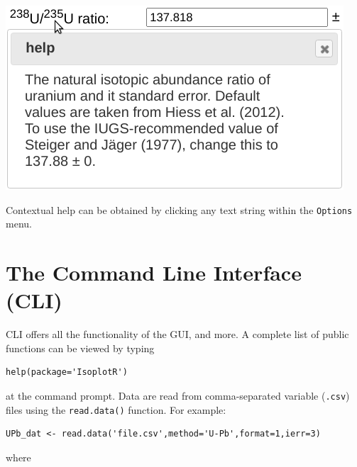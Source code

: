 \begin{refsection}
\noindent\begin{minipage}[t]{.45\textwidth}
\strut\vspace*{-\baselineskip}\newline
\includegraphics[width=\textwidth]{../figures/contextualhelp.png}
\end{minipage}
\begin{minipage}[t]{.55\textwidth}
Contextual help can be obtained by clicking any text string within the
\texttt{Options} menu.
\end{minipage}

\section{The Command Line Interface (CLI)}

CLI offers all the functionality of the GUI, and more. A complete list
of public functions can be viewed by typing

\begin{verbatim}
help(package='IsoplotR')
\end{verbatim}

\noindent at the command prompt. Data are read from comma-separated
variable (\texttt{.csv}) files using the \texttt{read.data()}
function. For example:

\begin{verbatim}
UPb_dat <- read.data('file.csv',method='U-Pb',format=1,ierr=3)
\end{verbatim}

\noindent where\\


\end{refsection}
